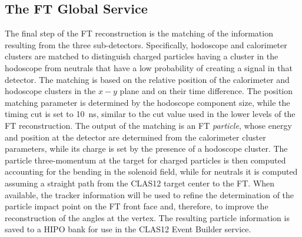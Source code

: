 \subsection{The FT Global Service}

The final step of the FT reconstruction is the matching of the information resulting from the three sub-detectors.
Specifically, hodoscope and calorimeter clusters are matched to distinguish charged particles having a cluster in the
hodoscope from neutrals that have a low probability of creating a signal in that detector. The matching is based on
the relative position of the calorimeter and hodoscope clusters in the $x-y$ plane and on their time difference. The
position matching parameter is determined by the hodoscope component size, while the timing cut is set to 10~ns,
similar to the cut value used in the lower levels of the FT reconstruction. The output of the matching is an FT
{\it particle}, whose energy and position at the detector are determined from the calorimeter cluster parameters,
while its charge is set by the presence of a hodoscope cluster. The particle three-momentum at the target for charged
particles is then computed accounting for the bending in the solenoid field, while for neutrals it is computed assuming
a straight path from the CLAS12 target center to the FT. When available, the tracker information will be used to
refine the determination of the particle impact point on the FT front face and, therefore, to improve the
reconstruction of the angles at the vertex. The resulting particle information is saved to a HIPO bank for use in
the CLAS12 Event Builder service.
